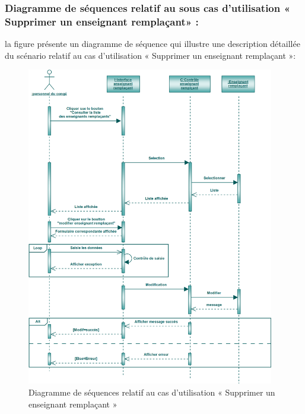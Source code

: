 \documentclass[12 pt ]{report}
\begin{document}
\subsubsection{Diagramme de séquences relatif au sous cas d’utilisation   « Supprimer un enseignant remplaçant» :}
la figure   présente un diagramme de séquence qui illustre une description détaillée du scénario relatif au  cas d’utilisation   « Supprimer un enseignant remplaçant »: 
\begin{figure}[h]
 \begin{center}
\includegraphics[width= 15 cm ,height=  14cm]{sec_mod_rem.PNG}
\caption{Diagramme de séquences relatif au  cas d’utilisation   «  Supprimer un enseignant remplaçant »}

\end{center}
\end{figure}
\newpage
\end{document}
